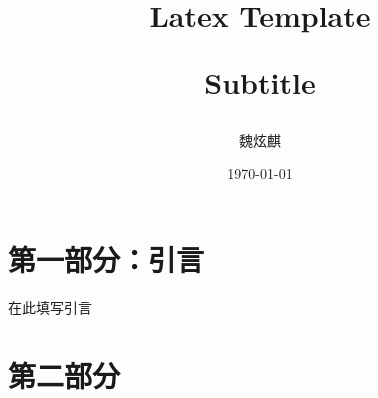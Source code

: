 \documentclass[hyperref,a4paper,UTF8]{ctexart}
\title{Latex Template \\
\begin{large} 
  Subtitle
\end{large} 
}
\author{魏炫麒}
\date{\today}
\begin{document}

\maketitle




\newpage
\tableofcontents

\thispagestyle{empty} %
\newpage


\section{第一部分：引言}

在此填写引言


\section{第二部分}




\end{document}
